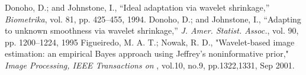 \documentclass[11pt]{article}
\begin{document}
\begin{thebibliography}{3}
	Donoho, D.; and Johnstone, I., “Ideal adaptation via wavelet shrinkage,” \emph{Biometrika}, vol. 81, pp. 425–455, 1994.
	Donoho, D.; and Johnstone, I., “Adapting to unknown smoothness via wavelet shrinkage,” \emph{J. Amer. Statist. Assoc.}, vol. 90, pp. 1200–1224, 1995
	Figueiredo, M. A. T.; Nowak, R. D., "Wavelet-based image estimation: an empirical Bayes approach using Jeffrey's noninformative prior," \emph{Image Processing, IEEE Transactions on} , vol.10, no.9, pp.1322,1331, Sep 2001.
\end{thebibliography}
\end{document}
